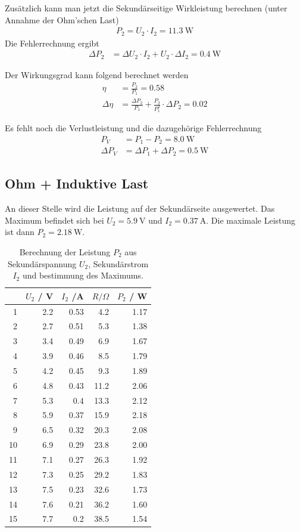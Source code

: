 \documentclass{article}
\newcommand{\W}{\text{W}}
\newcommand{\V}{\text{V}}
\newcommand{\A}{\text{A}}
\begin{document}
Zusätzlich kann man jetzt die Sekundärseitige Wirkleistung berechnen (unter Annahme der Ohm'schen Last)
\begin{align*}
P_2 = U_2\cdot I_2 = 11.3~\text{W}
\end{align*}
Die Fehlerrechnung ergibt
\begin{align*}
\Delta P_2 &= \Delta U_2\cdot I_2 + U_2\cdot \Delta I_2 = 0.4~\W
\end{align*}


Der Wirkungsgrad kann folgend berechnet werden
\begin{align*}
\eta &= \frac{P_2}{P_1} = 0.58 \\
\Delta \eta &= \frac{\Delta P_2}{P_1} + \frac{P_2}{P_1^2}\cdot \Delta P_2 = 0.02
\end{align*}

Es fehlt noch die Verlustleistung und die dazugehörige Fehlerrechnung
\begin{align*}
P_V &= P_1-P_2 = 8.0~\W\\
\Delta P_V &= \Delta P_1 + \Delta P_2 = 0.5~\W
\end{align*}


\subsection{Ohm + Induktive Last}

An dieser Stelle wird die Leistung auf der Sekundärseite ausgewertet. Das Maximum befindet sich bei $U_2=5.9~\V$ und $I_2=0.37~\A$. Die maximale Leistung ist dann $P_2=2.18~\W$.

\begin{table}[H]
\centering
\caption{Berechnung der Leistung $P_2$ aus Sekundärspannung $U_2$, Sekundärstrom $I_2$ und bestimmung des Maximums.}
\label{tab:spule}
\begin{tabular}{r|rrrr}
  &	$U_2$ / V  &	$I_2$ /A  &	$R / \Omega$ & $P_2$ / W \\
  \hline
1 &	2.2	&0.53	&	4.2	 &	1.17 \\
2 &	2.7	&0.51	&	5.3	 &	1.38 \\
3 &	3.4	&0.49	&	6.9  &	1.67 \\
4 &	3.9	&0.46	&	8.5	 &	1.79 \\
5 &	4.2	&0.45	&	9.3	 &	1.89 \\
6 &	4.8	&0.43	&	11.2	 &	2.06 \\
7 &	5.3	&0.4		&   13.3 &	2.12 \\
{\color{red}8} &	\color{red} 5.9	& \color{red} 0.37	& \color{red} 15.9	 &	\color{red} 2.18 \\
9 &	6.5	&0.32	&	20.3	 &	2.08 \\
10&	6.9	&0.29	&	23.8	 &	2.00 \\
11&	7.1	&0.27	&	26.3	 &	1.92 \\
12&	7.3	&0.25	&	29.2	 &	1.83 \\
13&	7.5	&0.23	&	32.6	 & 	1.73 \\
14&	7.6	&0.21	&	36.2 &	1.60 \\
15&	7.7	&0.2		&   38.5 &	1.54
\end{tabular}

\end{table}
\end{document}

